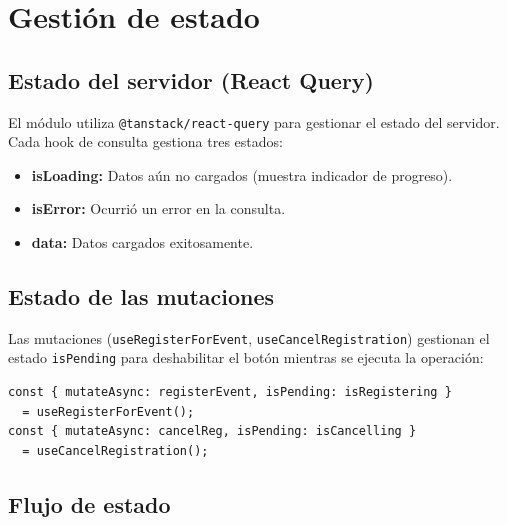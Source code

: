 
\section{Gesti\'on de estado}

\subsection{Estado del servidor (React Query)}

El m\'odulo utiliza \texttt{@tanstack/react-query} para gestionar
el estado del servidor. Cada hook de consulta gestiona tres estados:

\begin{itemize}
  \item \textbf{isLoading:} Datos a\'un no cargados (muestra
    indicador de progreso).
  \item \textbf{isError:} Ocurri\'o un error en la consulta.
  \item \textbf{data:} Datos cargados exitosamente.
\end{itemize}

\subsection{Estado de las mutaciones}

Las mutaciones (\texttt{useRegisterForEvent}, \texttt{useCancelRegistration})
gestionan el estado \texttt{isPending} para deshabilitar el bot\'on
mientras se ejecuta la operaci\'on:

\begin{verbatim}
const { mutateAsync: registerEvent, isPending: isRegistering }
  = useRegisterForEvent();
const { mutateAsync: cancelReg, isPending: isCancelling }
  = useCancelRegistration();
\end{verbatim}

\subsection{Flujo de estado}

